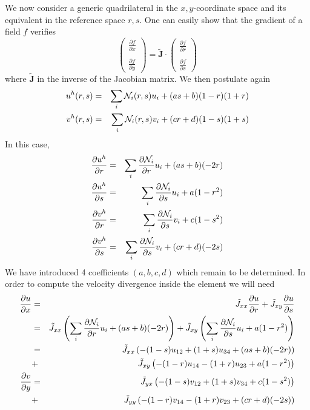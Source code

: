 We now consider a generic quadrilateral in the $x,y$-coordinate space and its equivalent in the 
reference space $r,s$. One can easily show that the gradient of a field $f$ verifies 
\[
\left(
\begin{array}{c}
\frac{\partial f}{\partial x} \\ \\
\frac{\partial f}{\partial y} 
\end{array}
\right)
=
\tilde{\bm J} \cdot
\left(
\begin{array}{c}
\frac{\partial f}{\partial r} \\ \\
\frac{\partial f}{\partial s} 
\end{array}
\right)
\]
where $\tilde{\bm J}$ in the inverse of the Jacobian matrix.
We then postulate again
\begin{eqnarray}
u^h(r,s)&=&\sum_i {\mathcal{N}}_i(r,s) u_i + (a s + b)(1-r)(1+r) \nonumber\\
v^h(r,s)&=&\sum_i {\mathcal{N}}_i(r,s) v_i + (c r + d)(1-s)(1+s) \nonumber
\end{eqnarray}
In this case,
\begin{eqnarray}
\frac{\partial u^h}{\partial r}&=&\sum_i \frac{\partial {\mathcal{N}}_i}{\partial r} u_i + (a s + b) (-2r)   \nonumber\\
\frac{\partial u^h}{\partial s}&=&\sum_i \frac{\partial {\mathcal{N}}_i}{\partial s} u_i + a (1-r^2) \nonumber\\
\frac{\partial v^h}{\partial r}&=&\sum_i \frac{\partial {\mathcal{N}}_i}{\partial s} v_i + c (1-s^2) \nonumber\\
\frac{\partial v^h}{\partial s}&=&\sum_i \frac{\partial {\mathcal{N}}_i}{\partial s} v_i + (c r + d)(-2s) \nonumber
\end{eqnarray}
We have introduced 4 coefficients  $(a,b,c,d)$ which remain to be determined.
In order to compute the velocity divergence inside the element we will need 
\begin{eqnarray}
\frac{\partial u}{\partial x} 
&=& \tilde{J}_{xx} \frac{\partial u}{\partial r} +  \tilde{J}_{xy} \frac{\partial u}{\partial s}  \nonumber\\
&=& \tilde{J}_{xx} \left( \sum_i \frac{\partial {\mathcal{N}}_i}{\partial r} u_i + (a s + b) (-2r)  \right) 
 +  \tilde{J}_{xy} \left( \sum_i \frac{\partial {\mathcal{N}}_i}{\partial s} u_i + a (1-r^2) \right)  \nonumber\\
&=& \tilde{J}_{xx} \left(  -(1-s) u_{12} + (1+s) u_{34} + (a s + b) (-2r)  \right) \nonumber\\ 
&+&  \tilde{J}_{xy} \left(  -(1-r) u_{14} - (1+r) u_{23} + a (1-r^2) \right)
\nonumber\\
\frac{\partial v}{\partial y} 
&=& \tilde{J}_{yx} \left(  -(1-s) v_{12} + (1+s) v_{34} + c (1-s^2)   \right)  \nonumber\\
&+&  \tilde{J}_{yy} \left(  -(1-r) v_{14} - (1+r) v_{23} + (cr+d) (-2s) \right) \nonumber
\end{eqnarray}
